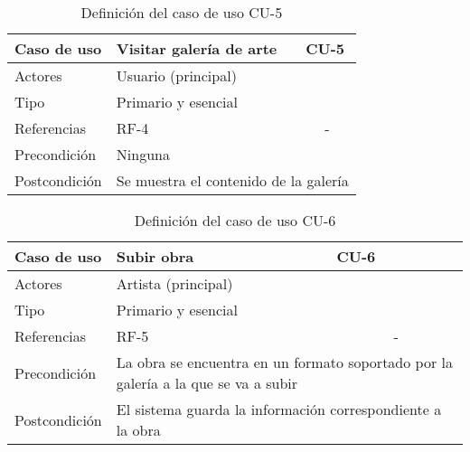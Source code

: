 \begin{table}[H]
    \begin{tabular}{|p{3cm}|p{5cm}|p{2cm}|}
        \hline
        Caso de uso & Visitar galería de arte & CU-5 \\
        \hline
        Actores & \multicolumn{2}{|p{7cm}|}{Usuario (principal)} \\
        \hline
        Tipo & \multicolumn{2}{|p{7cm}|}{Primario y esencial} \\
        \hline
        Referencias & RF-4 & \multicolumn{1}{|c|}{-} \\
        \hline
        Precondición & \multicolumn{2}{|p{7cm}|}{Ninguna} \\
        \hline
        Postcondición & \multicolumn{2}{|p{7cm}|}{Se muestra el contenido
        de la galería} \\
        \hline
    \end{tabular}
    \caption{Definición del caso de uso CU-5}
    \label{tab:cu_5}
\end{table}

\begin{table}[H]
    \begin{tabular}{|p{3cm}|p{5cm}|p{2cm}|}
        \hline
        Caso de uso & Subir obra & CU-6 \\
        \hline
        Actores & \multicolumn{2}{|p{7cm}|}{Artista (principal)} \\
        \hline
        Tipo & \multicolumn{2}{|p{7cm}|}{Primario y esencial} \\
        \hline
        Referencias & RF-5 & \multicolumn{1}{|c|}{-} \\
        \hline
        Precondición & \multicolumn{2}{|p{7cm}|}{La obra se encuentra en
        un formato soportado por la galería a la que se va a subir} \\
        \hline
        Postcondición & \multicolumn{2}{|p{7cm}|}{El sistema guarda la información
        correspondiente a la obra} \\
        \hline
    \end{tabular}
    \caption{Definición del caso de uso CU-6}
    \label{tab:cu_6}
\end{table}

